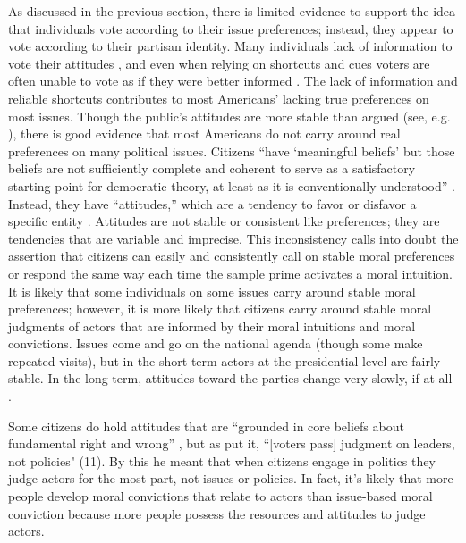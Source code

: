 As discussed in the previous section, there is limited evidence to support the idea that individuals vote according to their issue preferences; instead, they appear to vote according to their partisan identity. Many individuals lack of information to vote their attitudes \cite{DelliCarpiniKeeter1996}, and even when relying on shortcuts and cues voters are often unable to vote as if they were better informed \cite{Bartels1996}. The lack of information and reliable shortcuts contributes to most Americans' lacking true preferences on most issues. Though the public's attitudes are more stable than  argued (see, e.g. ), there is good evidence that most Americans do not carry around real preferences on many political issues. Citizens ``have `meaningful beliefs' but those beliefs are not sufficiently complete and coherent to serve as a satisfactory starting point for democratic theory, at least as it is conventionally understood'' \cite[48-49]{Bartels2003}. Instead, they have ``attitudes,'' which are a tendency to favor or disfavor a specific entity \cite[52]{Bartels2003}. Attitudes are not stable or consistent like preferences; they are tendencies that are variable and imprecise. This inconsistency calls into doubt the assertion that citizens can easily and consistently call on stable moral preferences \cite{SkitkaMorgan2014} or respond the same way each time the sample prime activates a moral intuition. It is likely that some individuals on some issues carry around stable moral preferences; however, it is more likely that citizens carry around stable moral judgments of actors that are informed by their moral intuitions and moral convictions. Issues come and go on the national agenda (though some make repeated visits), but in the short-term actors at the presidential level are fairly stable. In the long-term, attitudes toward the parties change very slowly, if at all \cite{GreenPalmquistSchickler2002,JenningsNiemi1981}.

Some citizens do hold attitudes that are ``grounded in core beliefs about fundamental right and wrong'' \cite[96]{SkitkaMorgan2014}, but as  put it, ``[voters pass] judgment on leaders, not policies" (11). By this he meant that when citizens engage in politics they judge actors for the most part, not issues or policies. In fact, it's likely that more people develop moral convictions that relate to actors than issue-based moral conviction because more people possess the resources and attitudes to judge actors.

